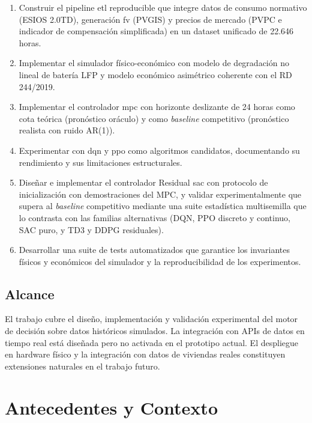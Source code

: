 \documentclass[12pt, a4paper, twoside]{report}
\begin{document}
\begin{enumerate}[label=\textbf{OE\arabic*.}]
  \item Construir el pipeline \acrshort{etl} reproducible que integre datos de
    consumo normativo (ESIOS 2.0TD), generación \acrshort{fv} (PVGIS) y precios
    de mercado (PVPC e indicador de compensación simplificada) en un dataset
    unificado de 22.646 horas.
  \item Implementar el simulador físico-económico con modelo de degradación no
    lineal de batería LFP y modelo económico asimétrico coherente con el
    RD 244/2019.
  \item Implementar el controlador \acrshort{mpc} con horizonte deslizante de
    24 horas como cota teórica (pronóstico oráculo) y como \textit{baseline}
    competitivo (pronóstico realista con ruido AR(1)).
  \item Experimentar con \acrshort{dqn} y \acrshort{ppo} como algoritmos
    candidatos, documentando su rendimiento y sus limitaciones estructurales.
  \item Diseñar e implementar el controlador Residual \acrshort{sac} con
    protocolo de inicialización con demostraciones del MPC, y validar
    experimentalmente que supera al \textit{baseline} competitivo mediante una
    suite estadística multisemilla que lo contrasta con las familias
    alternativas (DQN, PPO discreto y continuo, SAC puro, y TD3 y DDPG
    residuales).
  \item Desarrollar una suite de tests automatizados que garantice los
    invariantes físicos y económicos del simulador y la reproducibilidad
    de los experimentos.
\end{enumerate}

\section{Alcance}

El trabajo cubre el diseño, implementación y validación experimental del motor
de decisión sobre datos históricos simulados. La integración con APIs de datos
en tiempo real está diseñada pero no activada en el prototipo actual. El
despliegue en hardware físico y la integración con datos de viviendas reales
constituyen extensiones naturales en el trabajo futuro.

\chapter{Antecedentes y Contexto}
\label{chap:antecedentes}
\end{document}
